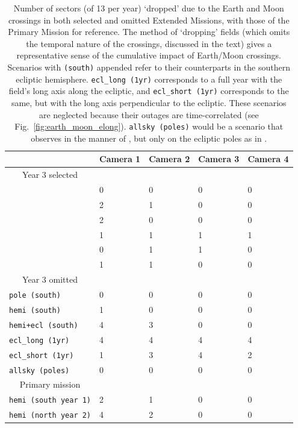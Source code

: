 \begin{table}[!tb]
	\centering
	\begin{tabular}{ | l | l | l | l | l | }
		\hline
		\ & Camera 1 & Camera 2 & Camera 3 & Camera 4 \\ \hline
		\multicolumn{1}{|c|}{Year 3 selected} & \  & \  & \  & \  \\ \hline
		\npole & 0 & 0 & 0 & 0 \\ \hline
		\nhemi & 2 & 1 & 0 & 0 \\ \hline
		\shemiAvoid & 2 & 0 & 0 & 0 \\ \hline
		\elong & 1 & 1 & 1 & 1 \\ \hline
		\eshort & 0 & 1 & 1 & 0 \\ \hline
		\hemis & 1 & 1 & 0 & 0 \\ \hline
		\multicolumn{1}{|c|}{Year 3 omitted} & \  & \  & \  & \  \\ \hline
		\texttt{pole\,(south)}  & 0 & 0 & 0 & 0 \\ \hline
		\texttt{hemi\,(south)} & 1 & 0 & 0 & 0 \\ \hline
		\texttt{hemi+ecl\,(south)} & 4 & 3 & 0 & 0 \\ \hline
		\texttt{ecl\_long\,(1yr)} & 4 & 4 & 4 & 4 \\ \hline
		\texttt{ecl\_short\,(1yr)} & 1 & 3 & 4 & 2 \\ \hline
		\texttt{allsky\,(poles)} & 0 & 0 & 0 & 0 \\ \hline
		\multicolumn{1}{|c|}{Primary mission} & \  & \  & \  & \  \\ \hline
		\texttt{hemi\,(south year 1)} & 2 & 1 & 0 & 0 \\ \hline
		\texttt{hemi\,(north year 2)} & 4 & 2 & 0 & 0 \\ \hline
	\end{tabular}
	\caption{Number of sectors (of 13 per year) `dropped' due to the Earth and Moon crossings in both selected and omitted Extended Missions, with those of the Primary Mission for reference. The method of `dropping' fields (which omits the temporal nature of the crossings, discussed in the text) gives a representative sense of the cumulative impact of Earth/Moon crossings. 
	Scenarios with \texttt{(south)} appended refer to their counterparts in the southern ecliptic hemisphere.
	\texttt{ecl\_long\,(1yr)} corresponds to a full year with the \tess field's long axis along the ecliptic, and \texttt{ecl\_short\,(1yr)} corresponds to the same, but with the long axis perpendicular to the ecliptic. These scenarios are neglected because their outages are time-correlated (see Fig.~\protect\ref{fig:earth_moon_elong}).
	\texttt{allsky\,(poles)} would be a scenario that observes in the manner of \hemis, but only on the ecliptic poles as in \npole.}
	\label{tab:dropped_fields}
\end{table}
